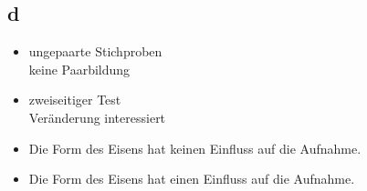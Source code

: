 \subsection{d}
\begin{itemize}
  \item ungepaarte Stichproben \\
        keine Paarbildung
  \item zweiseitiger Test \\
        Veränderung interessiert
  \item Die Form des Eisens hat keinen Einfluss auf die Aufnahme. 
  \item Die Form des Eisens hat einen Einfluss auf die Aufnahme. 
\end{itemize}

